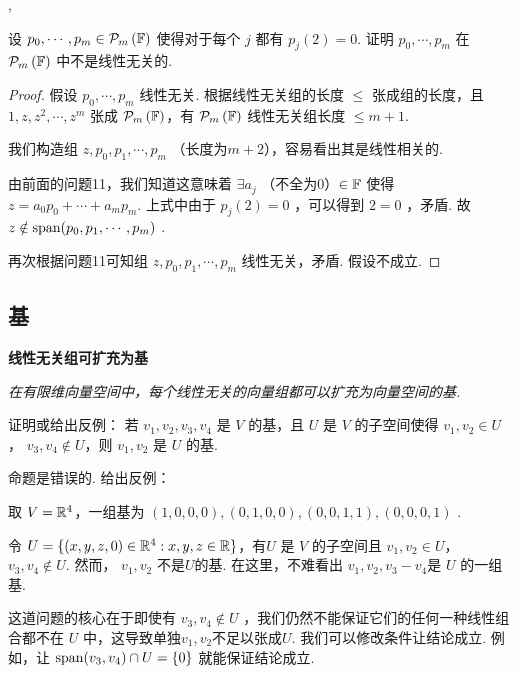 \documentclass[cn,hazy,blue,14pt,screen]{elegantnote}
\begin{document}
\sep

\begin{problem}
    设 $p_0,\cdots, p_m \in \polyn[\fs]{m}$ 使得对于每个 $j$ 都有 $p_j(2) = 0$. 证明 $p_0,\cdots, p_m$ 在 $\polyn[\fs]{m}$ 中不是线性无关的.
\end{problem}

\begin{proof}
    假设 $p_0,\cdots, p_m$ 线性无关. 根据线性无关组的长度 $\leqslant$ 张成组的长度，且 $1,z,z^2,\cdots,z^m$ 张成 $\polyn[\fs]{m}$，有 $\polyn[\fs]{m}$ 线性无关组长度 $\leqslant m+1$.

    我们构造组 $z,p_0,p_1,\cdots,p_m$ （长度为$m+2$），容易看出其是线性相关的.


    由前面的问题11，我们知道这意味着 $\exists a_j$ （不全为0）$ \in \fs$ 使得 $z=a_0p_0+\cdots+a_mp_m$. 上式中由于 $p_j(2)=0$ ，可以得到 $2=0$ ，矛盾. 故$z\notin \spn(p_0,p_1,\cdots,p_m)$ .

    再次根据问题11可知组 $z,p_0,p_1,\cdots,p_m$ 线性无关，矛盾. 假设不成立.
\end{proof}

\subsection{基}

\begin{theorem}
    \normalfont \textbf{线性无关组可扩充为基}

    \itshape 在有限维向量空间中，每个线性无关的向量组都可以扩充为向量空间的基.
\end{theorem}

\begin{problem}
    证明或给出反例： 若 $v_1,v_2,v_3,v_4$ 是 $V$ 的基，且 $U$ 是 $V$ 的子空间使得 $v_1,v_2 \in U$， $v_3,v_4\notin U$，则 $v_1,v_2$ 是 $U$ 的基.
\end{problem}

\begin{solution}
    命题是错误的. 给出反例：
    
    取 $V = \rs^4$，一组基为 $(1,0,0,0),(0,1,0,0),(0,0,1,1),(0,0,0,1)$ .

    令 $U=\{(x,y,z,0) \in \rs^4 : x,y,z \in \rs\}$，有$U$ 是 $V$ 的子空间且 $v_1,v_2 \in U$， $v_3,v_4\notin U$. 然而， $v_1,v_2$ 不是$U$的基.
    在这里，不难看出 $v_1,v_2,v_3-v_4$是 $U$ 的一组基.
\end{solution}

\begin{remark}
    这道问题的核心在于即使有 $v_3,v_4 \notin U$ ，我们仍然不能保证它们的任何一种线性组合都不在 $U$ 中，这导致单独$v_1,v_2$不足以张成$U$. 
    我们可以修改条件让结论成立. 例如，让 $\spn(v_3,v_4) \cap U = \{0\}$ 就能保证结论成立.
\end{remark}
\end{document}

